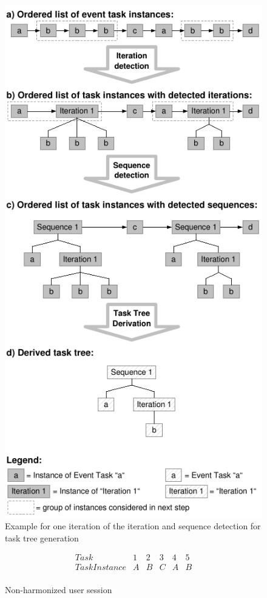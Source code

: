 \begin{figure}
	\centering
	\includegraphics[scale=0.85]{chapters/foundations/TaskDetection.pdf}
	\caption{Example for one iteration of the iteration and sequence detection for task tree generation}
	\label{fig:exampletasktreeharms}
\end{figure}

\begin{figure}
\[
\begin{array}{r|ccccc}
	Task & 1 & 2 & 3 & 4 & 5\\
	\hline
	TaskInstance & A & B & C & A & B\\
\end{array} 
\]
\caption{Non-harmonized user session}
\label{fig:nonharmonized}
\end{figure}

